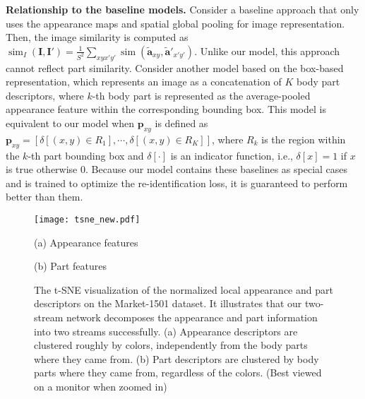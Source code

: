 \documentclass{llncs}
\begin{document}
\noindent\textbf{Relationship to the baseline models.} Consider a baseline approach that only uses the appearance maps and spatial global pooling for image representation. Then, the image similarity is computed as $\operatorname{sim}_I(\mathbf{I}, \mathbf{I}') = \frac{1}{S^2}\sum_{xyx'y'}{ \operatorname{sim}(\tilde{\mathbf{a}}_{xy}, \tilde{\mathbf{a}}'_{x'y'})}$.
Unlike our model, this approach cannot reflect part similarity.
Consider another model based on the box-based representation, which represents an image as a concatenation of $K$ body part descriptors, where $k$-th body part is represented as the average-pooled appearance feature within the corresponding bounding box. This model is equivalent to our model when $\mathbf{p}_{xy}$ is defined as $\mathbf{p}_{xy}=[\delta[(x,y)\in R_{1}], \cdots, \delta[(x,y)\in R_{K}]]$, where $R_k$ is the region within the $k$-th part bounding box and $\delta[\cdot]$ is an indicator function, i.e., $\delta[x] = 1$ if $x$ is true otherwise $0$.
Because our model contains these baselines as special cases and is trained to optimize the re-identification loss, it is guaranteed to perform better than them.

\begin{figure*}[t]
\centering  
	\begin{minipage}{0.99\linewidth}
	\texttt{[image: tsne\_new.pdf]} 
	\end{minipage}
\vspace{.2cm}

	\begin{minipage}{0.49\linewidth}
	\centering
	\small(a) Appearance features
	\end{minipage}
	\begin{minipage}{0.49\linewidth}
	\centering
	\small(b) Part features
	\end{minipage}
\vspace{-.3cm}
\caption{The t-SNE visualization of the normalized local appearance and part descriptors on the Market-1501 dataset. It illustrates that our two-stream network decomposes the appearance and part information into two streams successfully. (a) Appearance descriptors are clustered roughly by colors, independently from the body parts where they came from. (b) Part descriptors are clustered by body parts where they came from, regardless of the colors.
(Best viewed on a monitor when zoomed in)
} \label{fig:tsne}
\label{fig:separatemaps}
\end{figure*}
\end{document}
